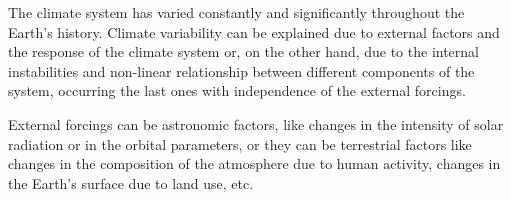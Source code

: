 
The climate system has varied constantly and significantly throughout the Earth's history. Climate variability can be explained due to external factors and the response of the climate system or, on the other hand, due to the internal instabilities and non-linear relationship between different components of the system, occurring the last ones with independence of the external forcings.


External forcings can be astronomic factors, like changes in the intensity of solar radiation or in the orbital parameters, or they can be terrestrial factors like changes in the composition of the atmosphere due to human activity, changes in the Earth's surface due to land use, etc.




